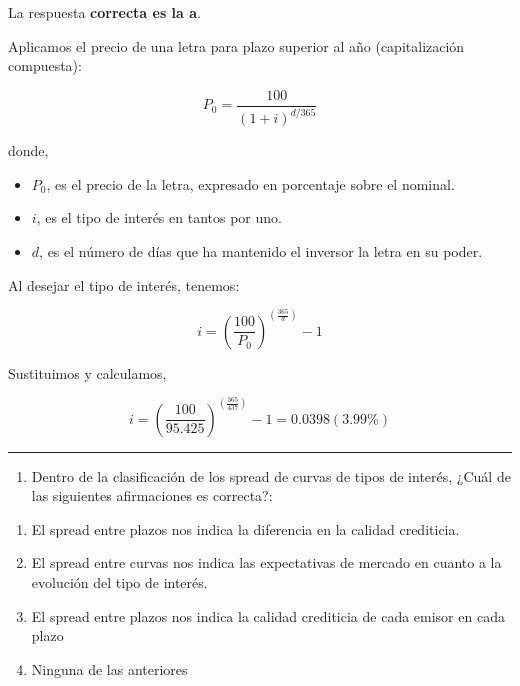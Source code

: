 \documentclass[
  letterpaper,
  DIV=11,
  numbers=noendperiod]{scrartcl}
\providecommand{\tightlist}{%
  \setlength{\itemsep}{0pt}\setlength{\parskip}{0pt}}\usepackage{longtable,booktabs,array}
\begin{document}
\begin{tcolorbox}[enhanced jigsaw, colframe=quarto-callout-note-color-frame, opacityback=0, colback=white, leftrule=.75mm, left=2mm, breakable, arc=.35mm, rightrule=.15mm, toprule=.15mm, bottomrule=.15mm]
\begin{minipage}[t]{5.5mm}
\textcolor{quarto-callout-note-color}{\faInfo}
\end{minipage}%
\begin{minipage}[t]{\textwidth - 5.5mm}

La respuesta \textbf{correcta es la a}.

Aplicamos el precio de una letra para plazo superior al año
(capitalización compuesta):

\[P_0=\frac{100}{(1+i)^{d/365}}\]

donde,

\begin{itemize}
\item
  \(P_0\), es el precio de la letra, expresado en porcentaje sobre el
  nominal.
\item
  \(i\), es el tipo de interés en tantos por uno.
\item
  \(d\), es el número de días que ha mantenido el inversor la letra en
  su poder.
\end{itemize}

Al desejar el tipo de interés, tenemos:

\[i=\left(\frac{100}{P_0}\right)^{\left(\frac{365}{d}\right) }-1\]

Sustituimos y calculamos,

\[i=\left(\frac{100}{95.425}\right)^{\left(\frac{365}{437}\right) }-1=0.0398(3.99\%)\]

\end{minipage}%
\end{tcolorbox}

\begin{center}\rule{0.5\linewidth}{0.5pt}\end{center}

\begin{enumerate}
\def\labelenumi{\arabic{enumi}.}
\setcounter{enumi}{14}
\tightlist
\item
  Dentro de la clasificación de los spread de curvas de tipos de
  interés, ¿Cuál de las siguientes afirmaciones es correcta?:
\end{enumerate}

\begin{enumerate}
\def\labelenumi{\alph{enumi}.}
\item
  El spread entre plazos nos indica la diferencia en la calidad
  crediticia.
\item
  El spread entre curvas nos indica las expectativas de mercado en
  cuanto a la evolución del tipo de interés.
\item
  El spread entre plazos nos indica la calidad crediticia de cada emisor
  en cada plazo
\item
  Ninguna de las anteriores
\end{enumerate}
\end{document}
